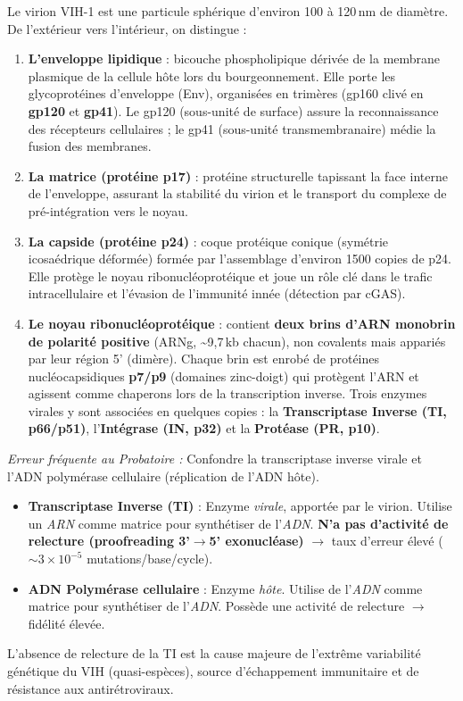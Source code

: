 \documentclass[11pt]{article}
\newcommand{\cle}[1]{{\popxbold\color{popdark}#1}}
\begin{document}
\noindent Le virion VIH-1 est une particule sphérique d'environ 100 à 120\,nm de diamètre. De l'extérieur vers l'intérieur, on distingue :
\begin{enumerate}
    \item \textbf{L'enveloppe lipidique} : bicouche phospholipique dérivée de la membrane plasmique de la cellule hôte lors du bourgeonnement. Elle porte les \cle{glycoprotéines d'enveloppe} (Env), organisées en trimères (gp160 clivé en \textbf{gp120} et \textbf{gp41}). Le gp120 (sous-unité de surface) assure la reconnaissance des récepteurs cellulaires ; le gp41 (sous-unité transmembranaire) médie la fusion des membranes.
    \item \textbf{La matrice (protéine p17)} : protéine structurelle tapissant la face interne de l'enveloppe, assurant la stabilité du virion et le transport du complexe de pré-intégration vers le noyau.
    \item \textbf{La capside (protéine p24)} : coque protéique conique (symétrie icosaédrique déformée) formée par l'assemblage d'environ 1500 copies de p24. Elle protège le noyau ribonucléoprotéique et joue un rôle clé dans le trafic intracellulaire et l'évasion de l'immunité innée (détection par cGAS).
    \item \textbf{Le noyau ribonucléoprotéique} : contient \textbf{deux brins d'ARN monobrin de polarité positive} (ARNg, \textasciitilde 9,7\,kb chacun), non covalents mais appariés par leur région 5' (dimère). Chaque brin est enrobé de protéines nucléocapsidiques \textbf{p7/p9} (domaines zinc-doigt) qui protègent l'ARN et agissent comme chaperons lors de la transcription inverse. Trois enzymes virales y sont associées en quelques copies : la \textbf{Transcriptase Inverse (TI, p66/p51)}, l'\textbf{Intégrase (IN, p32)} et la \textbf{Protéase (PR, p10)}.
\end{enumerate}

\begin{attention}
\emph{Erreur fréquente au Probatoire :} Confondre la transcriptase inverse virale et l'ADN polymérase cellulaire (réplication de l'ADN hôte).
\begin{itemize}
    \item \textbf{Transcriptase Inverse (TI)} : Enzyme \emph{virale}, apportée par le virion. Utilise un \emph{ARN} comme matrice pour synthétiser de l'\emph{ADN}. \textbf{N'a pas d'activité de relecture (proofreading 3'$\to$5' exonucléase)} $\rightarrow$ taux d'erreur élevé ($\sim 3 \times 10^{-5}$ mutations/base/cycle).
    \item \textbf{ADN Polymérase cellulaire} : Enzyme \emph{hôte}. Utilise de l'\emph{ADN} comme matrice pour synthétiser de l'\emph{ADN}. Possède une activité de relecture $\rightarrow$ fidélité élevée.
\end{itemize}
L'absence de relecture de la TI est la cause majeure de l'extrême variabilité génétique du VIH (quasi-espèces), source d'échappement immunitaire et de résistance aux antirétroviraux.
\end{attention}
\end{document}
